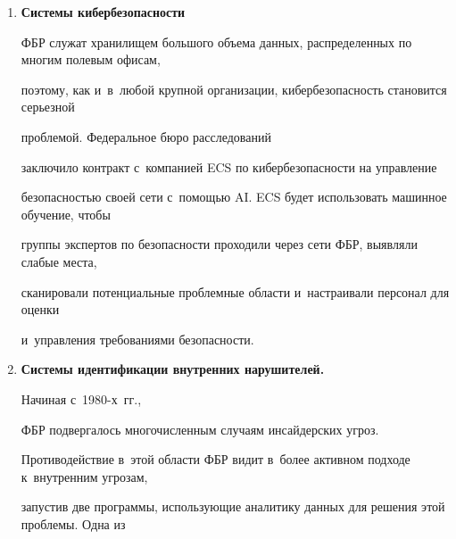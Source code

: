 \begin{enumerate}[1.]
от~2017~г. Среди прочего, это позволяет агентству создать сеть из этих машин, чтобы получить


доступ к~CODIS. В~2018~г.\ Национальный институт стандартов и~технологий (NIST, National Institute of Standards and


Technology) провел


оценку работы комплексов быстрой ДНК. Результаты показали, что, хотя машины способны


работать самостоятельно, модифицированный анализ с~вмешательством человека дал результаты


с~более высокой точ\-ностью.\\[-14.5pt]


\item %


\textbf{Системы кибербезопасности}


ФБР служат хранилищем большого объема данных, распределенных по многим полевым офисам,


поэтому, как и~в~любой крупной организации, кибербезопасность становится серьезной


проблемой. Федеральное бюро расследований


заключило контракт с~компанией ECS по кибербезопасности на управление


безопасностью своей сети с~по\-мощью AI. ECS будет использовать машинное обучение, чтобы


группы экспертов по безопас\-ности проходили через сети ФБР, выявляли слабые места,


сканировали потенциальные проб\-лем\-ные области и~настраивали персонал для оценки


и~управления требованиями безопас\-ности.\\[-14.5pt]





\pagebreak





\item %


\textbf{Системы идентификации внутренних нарушителей.}


Начиная с~1980-х~гг.,


ФБР подвергалось многочисленным случаям инсайдерских угроз.


Противодействие в~этой области ФБР видит в~более активном подходе к~внутренним угрозам,


запустив две программы, использующие аналитику данных для решения этой проблемы. Одна из



\end{enumerate}

